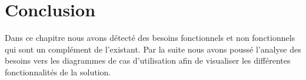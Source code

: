  
\section{Conclusion}
Dans ce chapitre nous avons d\'etect\'e des besoins fonctionnels et non fonctionnels qui sont un compl\'ement de l'existant. Par la suite nous avons pouss\'e l'analyse des besoins vers les diagrammes de cas d'utilisation afin de visualiser les diff\'erentes fonctionnalit\'es de la solution.